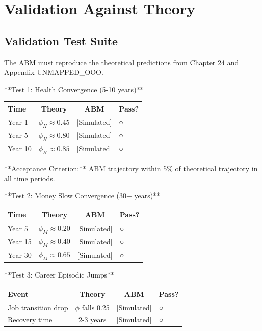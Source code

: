 \section{Validation Against Theory}
\label{ppp:validation}

\subsection{Validation Test Suite}

The ABM must reproduce the theoretical predictions from Chapter 24 and Appendix UNMAPPED_OOO.

**Test 1: Health Convergence (5-10 years)**

\begin{center}
\small
\begin{tabular}{@{}lcc@{}}
\toprule
\textbf{Time} & \textbf{Theory} & \textbf{ABM} & \textbf{Pass?} \\
\midrule
Year 1 & $\phi_H \approx 0.45$ & [Simulated] & ○ \\
Year 5 & $\phi_H \approx 0.80$ & [Simulated] & ○ \\
Year 10 & $\phi_H \approx 0.85$ & [Simulated] & ○ \\
\midrule
\end{tabular}
\end{center}

**Acceptance Criterion:** ABM trajectory within 5\% of theoretical trajectory in all time periods.

**Test 2: Money Slow Convergence (30+ years)**

\begin{center}
\small
\begin{tabular}{@{}lcc@{}}
\toprule
\textbf{Time} & \textbf{Theory} & \textbf{ABM} & \textbf{Pass?} \\
\midrule
Year 5 & $\phi_M \approx 0.20$ & [Simulated] & ○ \\
Year 15 & $\phi_M \approx 0.40$ & [Simulated] & ○ \\
Year 30 & $\phi_M \approx 0.65$ & [Simulated] & ○ \\
\midrule
\end{tabular}
\end{center}

**Test 3: Career Episodic Jumps**

\begin{center}
\small
\begin{tabular}{@{}lcc@{}}
\toprule
\textbf{Event} & \textbf{Theory} & \textbf{ABM} & \textbf{Pass?} \\
\midrule
Job transition drop & $\phi$ falls 0.25 & [Simulated] & ○ \\
Recovery time & 2-3 years & [Simulated] & ○ \\
\midrule
\end{tabular}
\end{center}


